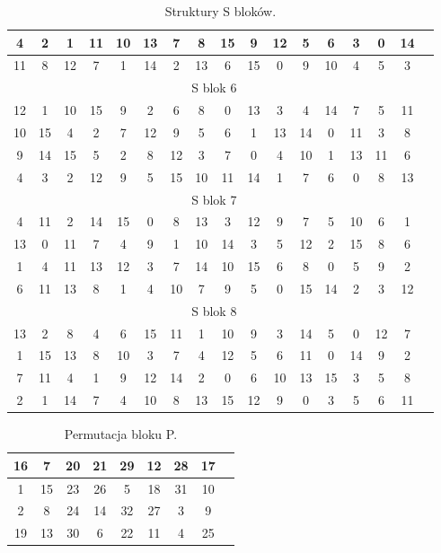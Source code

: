 \documentclass[12p]{article}
\begin{document}
\begin{table}[H]
\begin{tabular}{|c|c|c|c|c|c|c|c|c|c|c|c|c|c|c|c|c|}
4& 	2& 	1& 	11& 	10& 	13& 	7& 	8& 	15& 	9& 	12& 	5& 	6& 	3& 	0& 	14\\ \hline
11& 	8& 	12& 	7& 	1& 	14& 	2& 	13& 	6& 	15& 	0& 	9& 	10& 	4& 	5& 	3\\ \hline 
\multicolumn{16}{|c|}{S blok 6}\\ \hline
12& 	1& 	10& 	15& 	9& 	2& 	6& 	8& 	0& 	13& 	3& 	4& 	14& 	7& 	5& 	11\\ \hline
10 &	15& 	4& 	2& 	7& 	12& 	9& 	5& 	6& 	1& 	13& 	14& 	0& 	11& 	3& 	8\\ \hline
9& 	14& 	15& 	5& 	2& 	8& 	12& 	3& 	7& 	0& 	4& 	10& 	1& 	13& 	11& 	6\\ \hline
4& 	3& 	2& 	12& 	9& 	5& 	15& 	10& 	11& 	14& 	1& 	7& 	6& 	0& 	8& 	13\\ \hline
\multicolumn{16}{|c|}{S blok 7}\\ \hline
4& 	11& 	2& 	14& 	15& 	0& 	8& 	13& 	3& 	12& 	9& 	7& 	5& 	10& 	6& 	1\\ \hline
13& 	0& 	11& 	7& 	4& 	9& 	1& 	10& 	14& 	3& 	5& 	12& 	2& 	15& 	8& 	6\\ \hline
1& 	4& 	11& 	13& 	12& 	3& 	7& 	14& 	10& 	15& 	6& 	8& 	0& 	5& 	9& 	2\\ \hline
6& 	11& 	13& 	8& 	1& 	4& 	10& 	7& 	9& 	5& 	0& 	15& 	14& 	2& 	3& 	12\\ \hline 
\multicolumn{16}{|c|}{S blok 8}\\ \hline
13& 	2& 	8& 	4& 	6& 	15& 	11& 	1& 	10& 	9& 	3& 	14& 	5& 	0& 	12& 	7\\ \hline
1& 	15& 	13& 	8& 	10& 	3& 	7& 	4& 	12& 	5& 	6& 	11& 	0& 	14& 	9& 	2\\ \hline
7& 	11& 	4& 	1& 	9& 	12& 	14& 	2& 	0& 	6& 	10& 	13& 	15& 	3& 	5& 	8\\ \hline
2& 	1& 	14& 	7& 	4& 	10& 	8& 	13& 	15& 	12& 	9& 	0& 	3& 	5& 	6& 	11 \\ \hline
\end{tabular}
\caption{Struktury S bloków.}\label{s_bloki}
\end{table}



\begin{table}[H]
\centering
\begin{tabular}{|c|c|c|c|c|c|c|c|c|}
\hline
16 &	7 &	20& 	21& 	29& 	12& 	28& 	17\\ \hline
1 &	15& 	23& 	26& 	5& 	18& 	31& 	10\\ \hline
2 &	8 &	24 &	14& 	32& 	27& 	3 &	9\\ \hline
19 	&13 &	30& 	6& 	22& 	11& 	4& 	25\\ \hline
\end{tabular}
\caption{Permutacja bloku P.}~\label{blok_P}
\end{table}
\end{document}
